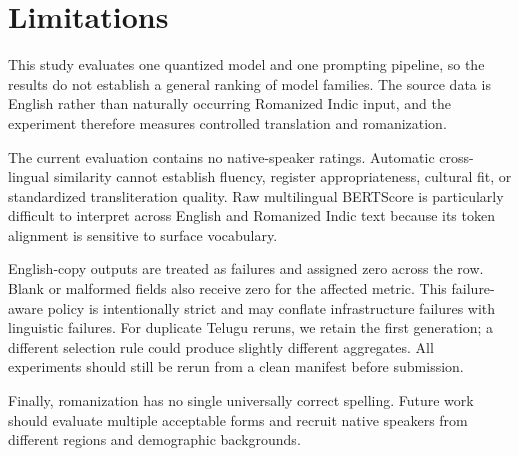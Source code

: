 \section{Limitations}

This study evaluates one quantized model and one prompting pipeline, so the
results do not establish a general ranking of model families. The source data
is English rather than naturally occurring Romanized Indic input, and the
experiment therefore measures controlled translation and romanization.

The current evaluation contains no native-speaker ratings. Automatic
cross-lingual similarity cannot establish fluency, register appropriateness,
cultural fit, or standardized transliteration quality. Raw multilingual
BERTScore is particularly difficult to interpret across English and Romanized
Indic text because its token alignment is sensitive to surface vocabulary.

English-copy outputs are treated as failures and assigned zero across the row.
Blank or malformed fields also receive zero for the affected metric. This
failure-aware policy is intentionally strict and may conflate infrastructure
failures with linguistic failures. For duplicate Telugu reruns, we retain the
first generation; a different selection rule could produce slightly different
aggregates. All experiments should still be rerun from a clean manifest before
submission.

Finally, romanization has no single universally correct spelling. Future work
should evaluate multiple acceptable forms and recruit native speakers from
different regions and demographic backgrounds.
